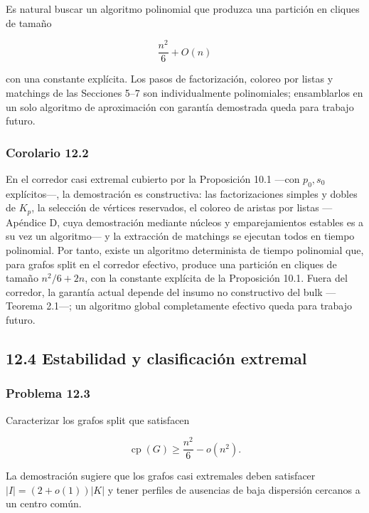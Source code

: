\documentclass[
  11pt,
]{article}
\begin{document}
Es natural buscar un algoritmo polinomial que produzca una partición en
cliques de tamaño

\[
\frac{n^2}{6}+O(n)
\]

con una constante explícita. Los pasos de factorización, coloreo por
listas y matchings de las Secciones 5--7 son individualmente
polinomiales; ensamblarlos en un solo algoritmo de aproximación con
garantía demostrada queda para trabajo futuro.

\subsubsection{Corolario 12.2}\label{corolario-12.2-algoritmo-efectivo-en-el-corredor}

En el corredor casi extremal cubierto por la Proposición 10.1 ---con
\(p_0,s_0\) explícitos---, la demostración es constructiva: las
factorizaciones simples y dobles de \(K_p\), la selección de vértices
reservados, el coloreo de aristas por listas ---Apéndice D, cuya
demostración mediante núcleos y emparejamientos estables es a su vez un
algoritmo--- y la extracción de matchings se ejecutan todos en tiempo
polinomial. Por tanto, existe un algoritmo determinista de tiempo
polinomial que, para grafos split en el corredor efectivo, produce una
partición en cliques de tamaño \(n^2/6+2n\), con la constante explícita
de la Proposición 10.1. Fuera del corredor, la garantía actual depende
del insumo no constructivo del bulk ---Teorema 2.1---; un algoritmo
global completamente efectivo queda para trabajo futuro.

\subsection{12.4 Estabilidad y clasificación
extremal}\label{estabilidad-y-clasificaciuxf3n-extremal}

\subsubsection{Problema 12.3}\label{problema-12.3}

Caracterizar los grafos split que satisfacen

\[
\operatorname{cp}(G)
\ge
\frac{n^2}{6}-o(n^2).
\]

La demostración sugiere que los grafos casi extremales deben satisfacer
\(|I|=(2+o(1))|K|\) y tener perfiles de ausencias de baja dispersión
cercanos a un centro común.
\end{document}
